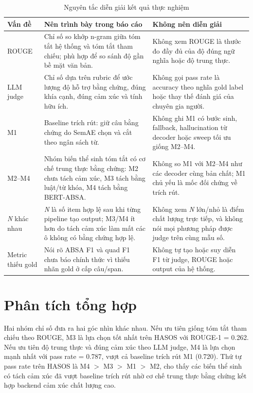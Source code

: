 \documentclass[12pt,a4paper]{report}
\begin{document}
\begin{table}[tbp]
\centering
\caption{Nguyên tắc diễn giải kết quả thực nghiệm}
\label{tab:reporting-principles}
\small
\begin{tabularx}{\textwidth}{L{0.24\textwidth} Y Y}
\toprule
\textbf{Vấn đề} & \textbf{Nên trình bày trong báo cáo} & \textbf{Không nên diễn giải} \\
\midrule
ROUGE & Chỉ số so khớp n-gram giữa tóm tắt hệ thống và tóm tắt tham chiếu; phù hợp để so sánh độ gần bề mặt văn bản. & Không xem ROUGE là thước đo đầy đủ của độ đúng ngữ nghĩa hoặc độ trung thực. \\
LLM judge & Chỉ số dựa trên rubric để ước lượng độ hỗ trợ bằng chứng, đúng khía cạnh, đúng cảm xúc và tính hữu ích. & Không gọi pass rate là accuracy theo nghĩa gold label hoặc thay thế đánh giá của chuyên gia người. \\
M1 & Baseline trích rút: giữ câu bằng chứng do SemAE chọn và cắt theo ngân sách từ. & Không ghi M1 có bước sinh, fallback, hallucination từ decoder hoặc sweep tối ưu giống M2--M4. \\
M2--M4 & Nhóm biến thể sinh tóm tắt có cơ chế trung thực bằng chứng: M2 chưa tách cảm xúc, M3 tách bằng luật/từ khóa, M4 tách bằng BERT-ABSA. & Không so M1 với M2--M4 như các decoder cùng bản chất; M1 chủ yếu là mốc đối chứng về trích rút. \\
\textit{N} khác nhau & \textit{N} là số item hợp lệ sau khi từng pipeline tạo output; M3/M4 ít hơn do tách cảm xúc làm mất các ô không có bằng chứng hợp lệ. & Không xem \textit{N} lớn/nhỏ là điểm chất lượng trực tiếp, và không nói mọi phương pháp được judge trên cùng mẫu số. \\
Metric thiếu gold & Nói rõ ABSA F1 và quad F1 chưa báo chính thức vì thiếu nhãn gold ở cấp câu/span. & Không tự tạo hoặc suy diễn F1 từ judge, ROUGE hoặc output của hệ thống. \\
\bottomrule
\end{tabularx}
\end{table}

\section{Phân tích tổng hợp}

Hai nhóm chỉ số đưa ra hai góc nhìn khác nhau. Nếu ưu tiên giống tóm tắt tham chiếu theo ROUGE, M3 là lựa chọn tốt nhất trên HASOS với ROUGE-1 = \num{0.262}. Nếu ưu tiên độ trung thực và đúng cảm xúc theo LLM judge, M4 là lựa chọn mạnh nhất với pass rate = \num{0.787}, vượt cả baseline trích rút M1 (\num{0.720}). Thứ tự pass rate trên HASOS là M4 $>$ M3 $>$ M1 $>$ M2, cho thấy các biến thể sinh có tách cảm xúc đã vượt baseline trích rút nhờ cơ chế trung thực bằng chứng kết hợp backend cảm xúc chất lượng cao.
\end{document}
